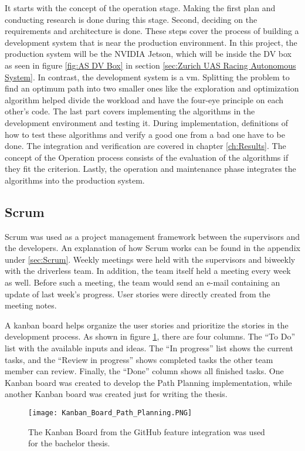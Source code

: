 It starts with the concept of the operation stage. Making the first plan and conducting research is done during this stage. Second, deciding on the requirements and architecture is done. These steps cover the process of building a development system that is near the production environment. In this project, the production system will be the NVIDIA Jetson, which will be inside the DV box as seen in figure \ref{fig:AS DV Box} in section \ref{sec:Zurich UAS Racing Autonomous System}.
In contrast, the development system is a \acrlong{vm}. Splitting the problem to find an optimum path into two smaller ones like the exploration and optimization algorithm helped divide the workload and have the four-eye principle on each other's code. The last part covers implementing the algorithms in the development environment and testing it. During implementation, definitions of how to test these algorithms and verify a good one from a bad one have to be done. The integration and verification are covered in chapter \ref{ch:Results}. The concept of the Operation process consists of the evaluation of the algorithms if they fit the criterion. Lastly, the operation and maintenance phase integrates the algorithms into the production system.

\subsection{Scrum} \label{sec:Planning Method: Scrum}
Scrum was used as a project management framework between the supervisors and the developers. An explanation of how Scrum works can be found in the appendix under \ref{sec:Scrum}. Weekly meetings were held with the supervisors and biweekly with the driverless team. In addition, the team itself held a meeting every week as well. Before such a meeting, the team would send an e-mail containing an update of last week's progress. User stories were directly created from the meeting notes.

A kanban board helps organize the user stories and prioritize the stories in the development process. As shown in figure \ref{fig:Kanban Board Path Planning}, there are four columns. The ``To Do'' list with the available inputs and ideas. The ``In progress'' list shows the current tasks, and the ``Review in progress'' shows completed tasks the other team member can review. Finally, the ``Done'' column shows all finished tasks. One Kanban board was created to develop the Path Planning implementation, while another Kanban board was created just for writing the thesis.
\begin{figure}[H]
    \centering
    \texttt{[image: Kanban\_Board\_Path\_Planning.PNG]}
    \caption{The Kanban Board from the GitHub feature integration was used for the bachelor thesis.}
    \label{fig:Kanban Board Path Planning}
\end{figure}

